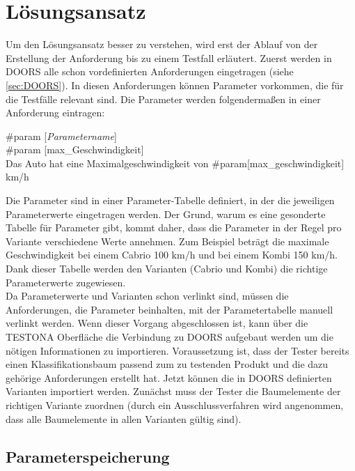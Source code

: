 \chapter{Lösungsansatz}\label{chp:loesungsansatz}

Um  den Lösungsansatz besser zu verstehen, wird erst der Ablauf von der Erstellung der Anforderung bis zu einem Testfall erläutert. Zuerst werden in DOORS alle schon vordefinierten Anforderungen eingetragen (siehe \ref{sec:DOORS}). In diesen Anforderungen können Parameter vorkommen, die für die Testfälle relevant sind. Die Parameter werden folgendermaßen in einer Anforderung eintragen:\\

\begin{center}
\#param [\textit{Parametername}]\\
\#param [max\_Geschwindigkeit]\\
Das Auto hat eine Maximalgeschwindigkeit von \#param[max\_geschwindigkeit] km/h
\end{center}

Die Parameter sind in einer Parameter-Tabelle definiert, in der die jeweiligen Parameterwerte eingetragen werden. Der Grund, warum es eine gesonderte Tabelle für Parameter gibt, kommt daher, dass die Parameter in der Regel pro Variante verschiedene Werte annehmen. Zum Beispiel beträgt die maximale Geschwindigkeit bei einem Cabrio 100 km/h  und bei einem Kombi 150 km/h. Dank dieser Tabelle werden den Varianten (Cabrio und Kombi) die richtige Parameterwerte zugewiesen.\\


Da Parameterwerte und Varianten schon verlinkt sind, müssen die Anforderungen, die Parameter beinhalten, mit der Parametertabelle manuell verlinkt werden. Wenn dieser Vorgang abgeschlossen ist, kann über die TESTONA Oberfläche die Verbindung zu DOORS aufgebaut werden um die nötigen Informationen zu importieren. Voraussetzung ist, dass der Tester bereits einen Klassifikationsbaum passend zum zu testenden Produkt und die dazu gehörige Anforderungen erstellt hat. Jetzt können die in DOORS definierten Varianten importiert werden. Zunächst muss der Tester die Baumelemente der richtigen Variante zuordnen (durch ein Ausschlussverfahren wird angenommen, dass alle Baumelemente in allen Varianten gültig sind). 


\newpage
\section{Parameterspeicherung}\label{sec.parameterspeicherung}
